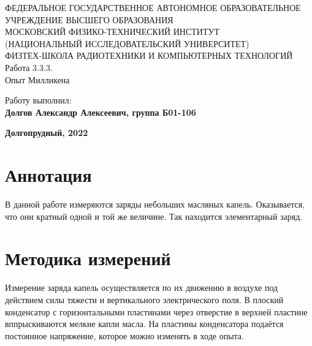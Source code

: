 \documentclass[14pt, a4paper,reqno]{article}
\begin{document}
\begin{center}
  {\small ФЕДЕРАЛЬНОЕ ГОСУДАРСТВЕННОЕ АВТОНОМНОЕ ОБРАЗОВАТЕЛЬНОЕ\\ УЧРЕЖДЕНИЕ ВЫСШЕГО ОБРАЗОВАНИЯ\\ МОСКОВСКИЙ ФИЗИКО-ТЕХНИЧЕСКИЙ ИНСТИТУТ\\ (НАЦИОНАЛЬНЫЙ ИССЛЕДОВАТЕЛЬСКИЙ УНИВЕРСИТЕТ)\\ ФИЗТЕХ-ШКОЛА РАДИОТЕХНИКИ И КОМПЬЮТЕРНЫХ ТЕХНОЛОГИЙ}\\
  \hfill \break
  \hfill \break
  \hfill \break
  \Huge{Работа 3.3.3. \\ Опыт Милликена}\\
\end{center}

\hfill \break
\hfill \break
\hfill \break
\hfill \break
\hfill \break
\hfill \break
\hfill \break
\hfill \break

\begin{flushright}
  \normalsize{Работу выполнил:}\\
  \normalsize{\textbf{Долгов Александр Алексеевич, группа Б01-106}}\\
\end{flushright}

\vspace*{\fill} %

\begin{center}
  \normalsize{\textbf{Долгопрудный, 2022}}
\end{center}

\thispagestyle{empty} %


\newpage
\thispagestyle{plain}
\tableofcontents
\thispagestyle{plain}
\newpage
\section{Аннотация}

    В данной работе измеряются заряды небольших масляных капель. Оказывается, 
    что они кратный одной и той же величине. Так находится элементарный заряд. 

\section{Методика измерений}

    Измерение заряда капель осуществляется по их движению в воздухе под действием
    силы тяжести и вертикального электрического поля. В плоский конденсатор с
    горизонтальными пластинами через отверстие в верхней пластине вппрыскиваются
    мелкие капли масла. На пластины конденсатора подаётся постоянное напряжение,
    которое можно изменять в ходе опыта.
\end{document}
